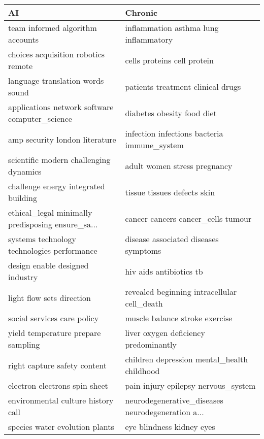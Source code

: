\begin{tabular}{ll}
\toprule
                                                AI &                                            Chronic \\
\midrule
                  team informed algorithm accounts &              inflammation asthma lung inflammatory \\
               choices acquisition robotics remote &                        cells proteins cell protein \\
                  language translation words sound &                  patients treatment clinical drugs \\
    applications network software computer\_science &                         diabetes obesity food diet \\
                    amp security london literature &        infection infections bacteria immune\_system \\
            scientific modern challenging dynamics &                       adult women stress pregnancy \\
              challenge energy integrated building &                        tissue tissues defects skin \\
 ethical\_legal minimally predisposing ensure\_sa... &                 cancer cancers cancer\_cells tumour \\
       systems technology technologies performance &               disease associated diseases symptoms \\
                   design enable designed industry &                            hiv aids antibiotics tb \\
                         light flow sets direction &        revealed beginning intracellular cell\_death \\
                       social services care policy &                     muscle balance stroke exercise \\
                yield temperature prepare sampling &              liver oxygen deficiency predominantly \\
                      right capture safety content &        children depression mental\_health childhood \\
                     electron electrons spin sheet &                pain injury epilepsy nervous\_system \\
                environmental culture history call &  neurodegenerative\_diseases neurodegeneration a... \\
                    species water evolution plants &                          eye blindness kidney eyes \\

\end{tabular}

